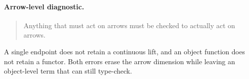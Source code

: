 \documentclass[11pt]{article}
\begin{document}
\paragraph{Arrow-level diagnostic.}
\begin{quote}
Anything that must act on arrows must be checked to actually act on arrows.
\end{quote}
A single endpoint does not retain a continuous lift, and an object function
does not retain a functor.  Both errors erase the arrow dimension while
leaving an object-level term that can still type-check.
\end{document}
